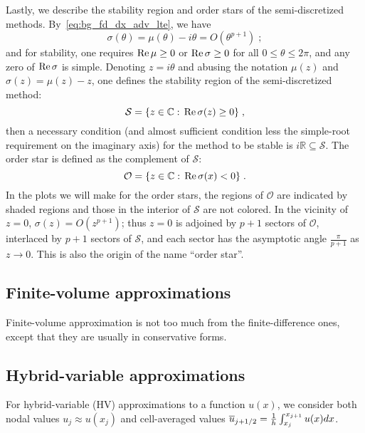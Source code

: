 Lastly, we describe the stability region and order stars of the semi-discretized methods.
By~\cref{eq:bg_fd_dx_adv_lte}, we have
\begin{equation}\label{eq:bg_fd_dx_mu_order}
  \sigma(\theta) = \mu(\theta) - i\theta = O(\theta^{p+1})\;;
\end{equation}
and for stability, one requires $\operatorname{Re}\mu\ge0$ or $\operatorname{Re}\sigma\ge0$ for all $0\le\theta\le2\pi$, and any zero of $\operatorname{Re}\sigma$ is simple.
Denoting $z=i\theta$ and abusing the notation $\mu(z)$ and $\sigma(z)=\mu(z)-z$, one defines the stability region of the semi-discretized method:
\begin{equation}\label{eq:bg_fd_dx_mu_stab}
  \mathcal{S} = \{z\in\mathbb{C}:\,\operatorname{Re}\sigma(z)\ge0\}\;,
\end{equation}
then a necessary condition (and almost sufficient condition less the simple-root requirement on the imaginary axis) for the method to be stable is $i\mathbb{R}\subseteq\mathcal{S}$.
The order star is defined as the complement of $\mathcal{S}$:
\begin{equation}\label{eq:bg_fd_dx_mu_os}
  \mathcal{O} = \{z\in\mathbb{C}:\,\operatorname{Re}\sigma(x)<0\}\;.
\end{equation}
In the plots we will make for the order stars, the regions of $\mathcal{O}$ are indicated by shaded regions and those in the interior of $\mathcal{S}$ are not colored.
In the vicinity of $z=0$, $\sigma(z)=O(z^{p+1})$; thus $z=0$ is adjoined by $p+1$ sectors of $\mathcal{O}$, interlaced by $p+1$ sectors of $\mathcal{S}$, and each sector has the asymptotic angle $\frac{\pi}{p+1}$ as $z\to0$.
This is also the origin of the name ``order star''.

\subsection{Finite-volume approximations}
\label{sec:bg_fv}
Finite-volume approximation is not too much from the finite-difference ones, except that they are usually in conservative forms.

\subsection{Hybrid-variable approximations}
\label{sec:bg_hv}
For hybrid-variable (HV) approximations to a function $u(x)$, we consider both nodal values $u_j\approx u(x_j)$ and cell-averaged values $\overline{u}_{{{j}+1/2}}=\frac{1}{h}\int_{x_j}^{x_{j+1}}u(x)dx$.

